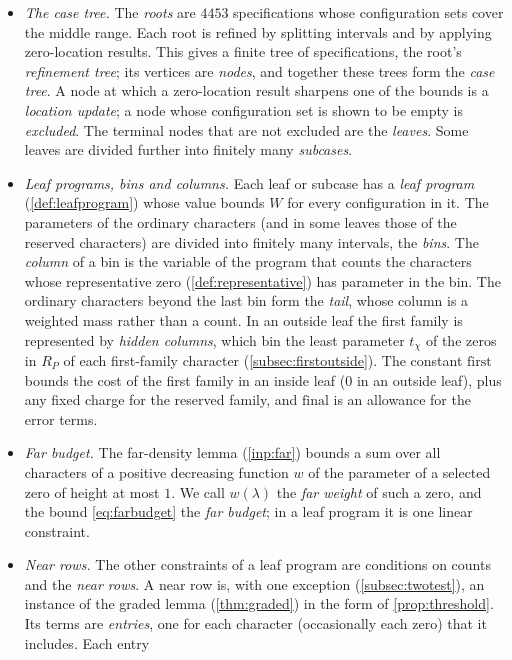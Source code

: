 \begin{itemize}
  \item \emph{The case tree.} The \emph{roots} are $4453$ specifications whose configuration sets
    cover the middle range. Each root is refined by splitting intervals and by applying
    zero-location results. This gives a finite tree of specifications, the root's
    \emph{refinement tree}; its vertices are \emph{nodes}, and together these trees form the
    \emph{case tree}. A node at which a zero-location result sharpens one of the bounds is a
    \emph{location update}; a node whose configuration set is shown to be empty is
    \emph{excluded}. The terminal nodes that are not excluded are the \emph{leaves}. Some leaves
    are divided further into finitely many \emph{subcases}.
  \item \emph{Leaf programs, bins and columns.} Each leaf or subcase has a \emph{leaf program}
    (\cref{def:leafprogram}) whose value bounds $W$ for every configuration in it. The parameters of
    the ordinary characters (and in some leaves those of the reserved characters) are divided into
    finitely many intervals, the \emph{bins}. The \emph{column} of a bin is the variable of the
    program that counts the characters whose representative zero (\cref{def:representative}) has
    parameter in the bin. The ordinary characters beyond the last bin form the \emph{tail}, whose
    column is a weighted mass rather than a count. In an outside leaf the first family is
    represented by \emph{hidden columns}, which bin the least parameter $t_\chi$ of the zeros in $R_P$
    of each first-family character (\cref{subsec:firstoutside}). The constant $\mathrm{first}$
    bounds the cost of the first family in an inside leaf ($0$ in an outside leaf), plus any fixed
    charge for the reserved family, and $\mathrm{final}$ is an allowance for the error terms.
  \item \emph{Far budget.} The far-density lemma (\cref{inp:far}) bounds a sum over all characters
    of a positive decreasing function $w$ of the parameter of a selected zero of height at most
    $1$. We call $w(\lambda)$ the \emph{far weight} of such a zero, and the bound
    \eqref{eq:farbudget} the \emph{far budget}; in a leaf program it is one linear constraint.
  \item \emph{Near rows.} The other constraints of a leaf program are conditions on counts and the
    \emph{near rows}. A near row is, with one exception (\cref{subsec:twotest}), an instance of the
    graded lemma (\cref{thm:graded}) in the form of \cref{prop:threshold}. Its terms are
    \emph{entries}, one for each character (occasionally each zero) that it includes. Each entry

\end{itemize}
